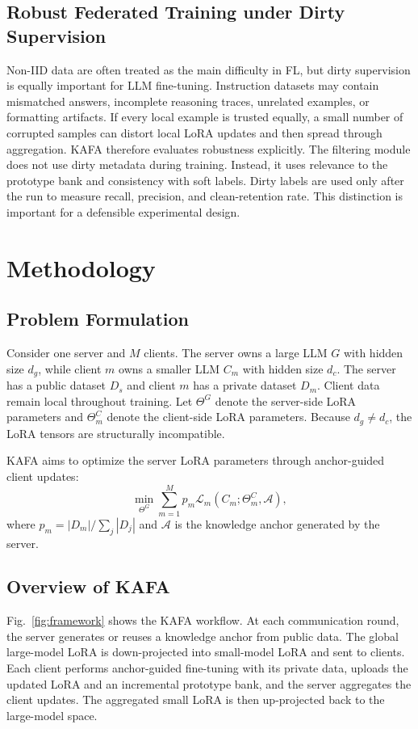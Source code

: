 \documentclass[conference]{IEEEtran}
\begin{document}
\subsection{Robust Federated Training under Dirty Supervision}
Non-IID data are often treated as the main difficulty in FL, but dirty supervision is equally important for LLM fine-tuning. Instruction datasets may contain mismatched answers, incomplete reasoning traces, unrelated examples, or formatting artifacts. If every local example is trusted equally, a small number of corrupted samples can distort local LoRA updates and then spread through aggregation. KAFA therefore evaluates robustness explicitly. The filtering module does not use dirty metadata during training. Instead, it uses relevance to the prototype bank and consistency with soft labels. Dirty labels are used only after the run to measure recall, precision, and clean-retention rate. This distinction is important for a defensible experimental design.

\section{Methodology}
\subsection{Problem Formulation}
Consider one server and $M$ clients. The server owns a large LLM $G$ with hidden size $d_g$, while client $m$ owns a smaller LLM $C_m$ with hidden size $d_c$. The server has a public dataset $D_s$ and client $m$ has a private dataset $D_m$. Client data remain local throughout training. Let $\Theta^G$ denote the server-side LoRA parameters and $\Theta_m^C$ denote the client-side LoRA parameters. Because $d_g \ne d_c$, the LoRA tensors are structurally incompatible.

KAFA aims to optimize the server LoRA parameters through anchor-guided client updates:
\begin{equation}
\min_{\Theta^G} \sum_{m=1}^{M} p_m \mathcal{L}_m(C_m; \Theta_m^C, \mathcal{A}),
\end{equation}
where $p_m=|D_m|/\sum_j |D_j|$ and $\mathcal{A}$ is the knowledge anchor generated by the server.

\subsection{Overview of KAFA}
Fig.~\ref{fig:framework} shows the KAFA workflow. At each communication round, the server generates or reuses a knowledge anchor from public data. The global large-model LoRA is down-projected into small-model LoRA and sent to clients. Each client performs anchor-guided fine-tuning with its private data, uploads the updated LoRA and an incremental prototype bank, and the server aggregates the client updates. The aggregated small LoRA is then up-projected back to the large-model space.
\end{document}
